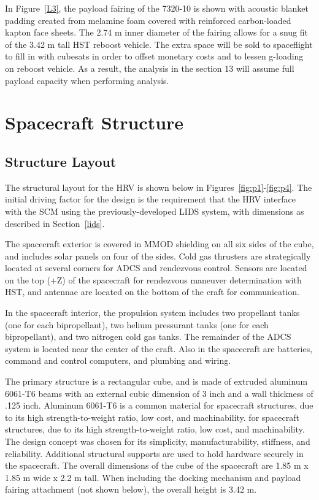 \documentclass[paper=letter, fontsize=11pt]{scrartcl} %
\numberwithin{equation}{section} %
\numberwithin{figure}{section} %
\numberwithin{table}{section} %
\begin{document}
In Figure~\ref{L3}, the payload fairing of the 7320-10 is shown with acoustic blanket padding created from melamine foam covered with reinforced carbon-loaded kapton face sheets. The 2.74 m inner diameter of the fairing allows for a snug fit of the 3.42 m tall HST reboost vehicle. The extra space will be sold to spaceflight to fill in with cubesats in order to offset monetary costs and to lessen g-loading on reboost vehicle. As a result, the analysis in the section 13 will assume full payload capacity when performing analysis.


\section{Spacecraft Structure} \label{section:structure}
\subsection{Structure Layout}
The structural layout for the HRV is shown below in Figures~\ref{fig:p1}-\ref{fig:p4}. The initial driving factor for the design is the requirement that the HRV interface with the SCM using the previously-developed LIDS system, with dimensions as described in Section~\ref{lids}.

The spacecraft exterior is covered in MMOD shielding on all six sides of the cube, and includes solar panels on four of the sides. Cold gas thrusters are strategically located at several corners for ADCS and rendezvous control. Sensors are located on the top (+Z) of the spacecraft for rendezvous maneuver determination with HST, and antennae are located on the bottom of the craft for communication.

In the spacecraft interior, the propulsion system includes two propellant tanks (one for each bipropellant), two helium pressurant tanks (one for each bipropellant), and two nitrogen cold gas tanks. The remainder of the ADCS system is located near the center of the craft. Also in the spacecraft are batteries, command and control computers, and plumbing and wiring.

The primary structure is a rectangular cube, and is made of extruded aluminum 6061-T6 beams with an external cubic dimension of 3 inch and a wall thickness of .125 inch. Aluminum 6061-T6 is a common material for spacecraft structures, due to its high strength-to-weight ratio, low cost, and machinability. for spacecraft structures, due to its high strength-to-weight ratio, low cost, and machinability. The design concept was chosen for its simplicity, manufacturability, stiffness, and reliability. Additional structural supports are used to hold hardware securely in the spacecraft. The overall dimensions of the cube of the spacecraft are 1.85 m x 1.85 m wide x 2.2 m tall. When including the docking mechanism and payload fairing attachment (not shown below), the overall height is 3.42 m.
\end{document}
